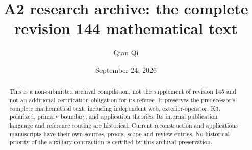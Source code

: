 \title[Unsubmitted A2 research archive]{A2 research archive: the complete revision 144 mathematical text}
\author{Qian Qi}
\date{September 24, 2026}
\begin{abstract}
This is a non-submitted archival compilation, not the supplement of
revision 145 and not an additional certification obligation for its
referee.  It preserves the predecessor's complete mathematical text,
including independent web, exterior-operator, K3, polarized, primary
boundary, and application theories.  Its internal publication language
and reference routing are historical.  Current reconstruction and
applications manuscripts have their own sources, proofs, scope and
review entries.  No historical priority of the auxiliary contraction is
certified by this archival preservation.
\end{abstract}
\maketitle
